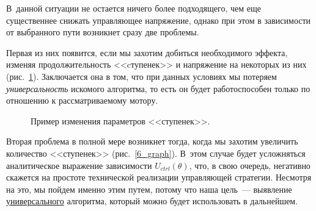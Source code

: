 \documentclass[12pt,a4paper,openany]{extarticle}
\begin{document}
В~данной ситуации не остается ничего более подходящего, чем еще существеннее снижать управляющее напряжение, однако при этом в зависимости от выбранного пути возникнет сразу две проблемы.

Первая из них появится, если мы захотим добиться необходимого эффекта, изменяя продолжительность <<cтупенек>> и напряжение на некоторых из них (рис.~\ref{5_graph}).
Заключается она в том, что при данных условиях мы потеряем \textit{универсальность} искомого алгоритма, то есть он будет работоспособен только по отношению к рассматриваемому мотору.

\begin{figure}[h]
	\noindent{}
	\caption{Пример изменения параметров <<ступенек>>.}
	\label{5_graph}
\end{figure}

Вторая проблема в полной мере возникнет тогда, когда мы захотим увеличить количество <<ступенек>> (рис.~\ref{6_graph}).
В~этом случае будет усложняться аналитическое выражение зависимости $U_{ctrl}(\theta)$, что, в свою очередь, негативно скажется на простоте технической реализации управляющей стратегии. Несмотря на это, мы пойдем именно этим путем, потому что наша цель~--- выявление \underline{универсального} алгоритма, который можно будет использовать в дальнейшем.
\end{document}
